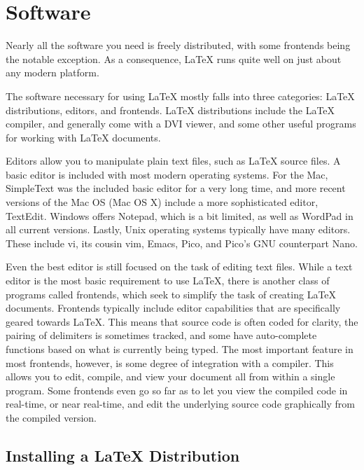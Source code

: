 \chapter{Software}
\label{cha:software}

Nearly all the software you need is freely distributed, with some
frontends being the notable exception.  As a consequence, \LaTeX{}
runs quite well on just about any modern platform.

The software necessary for using \LaTeX{} mostly falls into three
categories: \LaTeX{} distributions, editors, and frontends.  \LaTeX{}
distributions include the \LaTeX{} compiler, and generally come with a
DVI viewer, and some other useful programs for working with \LaTeX{}
documents.

Editors allow you to manipulate plain text files, such as \LaTeX{}
source files.  A basic editor is included with most modern operating
systems.  For the Mac, SimpleText was the included basic editor for a
very long time, and more recent versions of the Mac OS (Mac OS X)
include a more sophisticated editor, TextEdit.  Windows offers
Notepad, which is a bit limited, as well as WordPad in all current
versions.  Lastly, Unix operating systems typically have many
editors.  These include vi, its cousin vim, Emacs, Pico, and Pico's
GNU counterpart Nano.

Even the best editor is still focused on the task of editing text
files.  While a text editor is the most basic requirement to use
\LaTeX{}, there is another class of programs called frontends, which
seek to simplify the task of creating \LaTeX{} documents.  Frontends
typically include editor capabilities that are specifically geared
towards \LaTeX{}.  This means that source code is often coded for
clarity, the pairing of delimiters is sometimes tracked, and some have
auto-complete functions based on what is currently being typed.  The
most important feature in most frontends, however, is some degree of
integration with a compiler.  This allows you to edit, compile, and
view your document all from within a single program.  Some frontends
even go so far as to let you view the compiled code in real-time, or
near real-time, and edit the underlying source code graphically from
the compiled version.

\section{Installing a \LaTeX{} Distribution}
\label{sec:inst-latex-distr}

